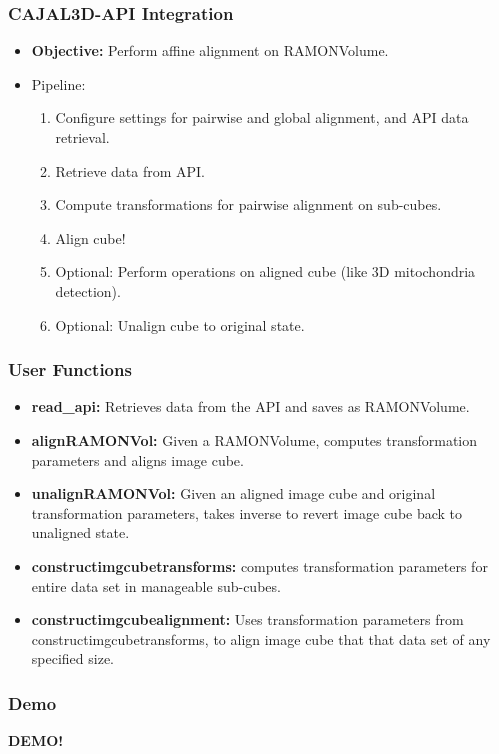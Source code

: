 \documentclass{beamer}
\begin{document}
\begin{frame}
\frametitle{CAJAL3D-API Integration}
\begin{itemize}
\item \textbf{Objective:} Perform affine alignment on RAMONVolume.
\item Pipeline:
\begin{enumerate}
\item Configure settings for pairwise and global alignment, and API data retrieval. 
\item Retrieve data from API. 
\item Compute transformations for pairwise alignment on sub-cubes.
\item Align cube!
\item Optional: Perform operations on aligned cube (like 3D mitochondria detection).
\item Optional: Unalign cube to original state. 
\end{enumerate}
\end{itemize}
\end{frame}

\begin{frame}
\frametitle{User Functions}
\begin{itemize}
\item \textbf{read\_api:} Retrieves data from the API and saves as RAMONVolume.
\item \textbf{alignRAMONVol:} Given a RAMONVolume, computes transformation parameters and aligns image cube.
\item \textbf{unalignRAMONVol:} Given an aligned image cube and original transformation parameters, takes inverse to revert image cube back to unaligned state.
\item \textbf{constructimgcubetransforms:} computes transformation parameters for entire data set in manageable sub-cubes.
\item \textbf{constructimgcubealignment:} Uses transformation parameters from constructimgcubetransforms, to align image cube that that data set of any specified size.
\end{itemize}
\end{frame}

\begin{frame}
\frametitle{Demo}
\textbf{DEMO!}
\end{frame}
\end{document}
